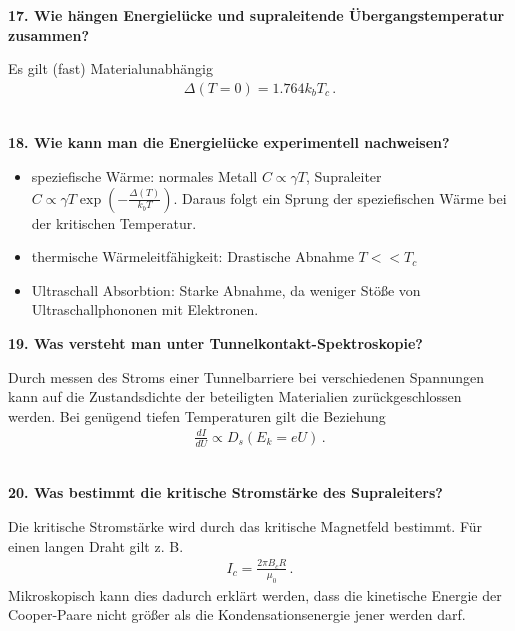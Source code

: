 \noindent\textbf{17. Wie hängen Energielücke und supraleitende Übergangstemperatur zusammen?}\\
\begin{addmargin}[25pt]{0pt}
Es gilt (fast) Materialunabhängig
\begin{align}
    \Delta(T=0) = 1.764 k_b T_c \,.
\end{align}\\
\end{addmargin}

\noindent\textbf{18. Wie kann man die Energielücke experimentell nachweisen?}\\
\begin{addmargin}[25pt]{0pt}
\begin{itemize}
    \item speziefische Wärme: normales Metall $C \propto \gamma T$, Supraleiter $C \propto \gamma T \exp \left(-\frac{\Delta(T)}{k_b T}\right)$. Daraus folgt ein Sprung der speziefischen Wärme bei der kritischen Temperatur.
    \item thermische Wärmeleitfähigkeit: Drastische Abnahme $T << T_c$
    \item Ultraschall Absorbtion: Starke Abnahme, da weniger Stöße von Ultraschallphononen mit Elektronen.
\end{itemize}
\end{addmargin}

\noindent\textbf{19. Was versteht man unter Tunnelkontakt-Spektroskopie?}\\
\begin{addmargin}[25pt]{0pt}
Durch messen des Stroms einer Tunnelbarriere bei verschiedenen Spannungen kann auf die Zustandsdichte der beteiligten Materialien zurückgeschlossen werden. Bei genügend tiefen Temperaturen gilt die Beziehung
\begin{align}
    \frac{dI}{dU} \propto D_s(E_k = eU) \,.
\end{align}\\
\end{addmargin}

\noindent\textbf{20. Was bestimmt die kritische Stromstärke des Supraleiters?}\\
\begin{addmargin}[25pt]{0pt}
Die kritische Stromstärke wird durch das kritische Magnetfeld bestimmt. Für einen langen Draht gilt z. B.
\begin{align}
    I_c = \frac{2\pi B_c R}{\mu_0} \,.
\end{align}
Mikroskopisch kann dies dadurch erklärt werden, dass die kinetische Energie der Cooper-Paare nicht größer als die Kondensationsenergie jener werden darf.\\
\end{addmargin}

